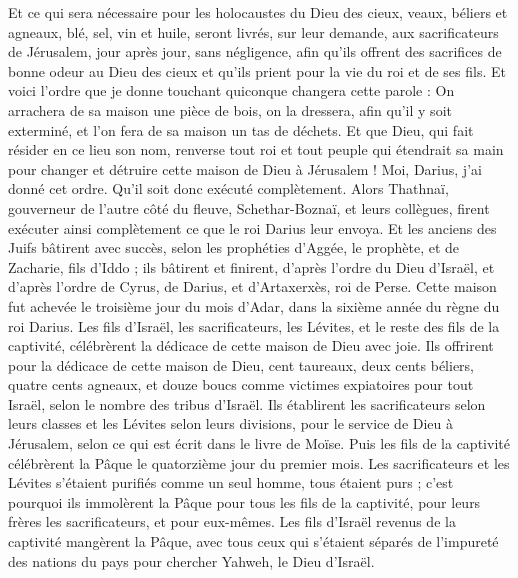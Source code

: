 \begin{multicols}{2}
Et ce qui sera nécessaire pour les holocaustes du Dieu des cieux, veaux, béliers et agneaux, blé, sel, vin et huile, seront livrés, sur leur demande, aux sacrificateurs de Jérusalem, jour après jour, sans négligence,
afin qu'ils offrent des sacrifices de bonne odeur au Dieu des cieux et qu'ils prient pour la vie du roi et de ses fils.
Et voici l’ordre que je donne touchant quiconque changera cette parole : On arrachera de sa maison une pièce de bois, on la dressera, afin qu'il y soit exterminé, et l’on fera de sa maison un tas de déchets.
Et que Dieu, qui fait résider en ce lieu son nom, renverse tout roi et tout peuple qui étendrait sa main pour changer et détruire cette maison de Dieu à Jérusalem ! Moi, Darius, j’ai donné cet ordre. Qu'il soit donc exécuté complètement.
Alors Thathnaï, gouverneur de l'autre côté du fleuve,  Schethar-Boznaï, et leurs collègues, firent exécuter ainsi complètement ce que le roi Darius leur envoya.
Et les anciens des Juifs bâtirent avec succès, selon les prophéties d'Aggée, le prophète, et de Zacharie, fils d’Iddo ; ils bâtirent et finirent, d'après l'ordre du Dieu d'Israël, et d'après l'ordre de Cyrus, de Darius, et d'Artaxerxès, roi de Perse.
Cette maison fut achevée le troisième jour du mois d'Adar, dans la sixième année du règne du roi Darius.
Les fils d'Israël, les sacrificateurs, les Lévites, et le reste des fils de la captivité, célébrèrent la dédicace de cette maison de Dieu avec joie.
Ils offrirent pour la dédicace de cette maison de Dieu, cent taureaux, deux cents béliers, quatre cents agneaux, et douze boucs comme victimes expiatoires pour tout Israël, selon le nombre des tribus d'Israël.
Ils établirent les sacrificateurs selon leurs classes et les Lévites selon leurs divisions, pour le service de Dieu à Jérusalem,  selon ce qui est écrit dans le livre de Moïse.
Puis les fils de la captivité célébrèrent la Pâque le quatorzième jour du premier mois.
Les sacrificateurs et les Lévites s'étaient purifiés comme un seul homme, tous étaient purs ; c'est pourquoi ils immolèrent la Pâque pour tous les fils de la captivité, pour leurs frères les sacrificateurs, et pour eux-mêmes.
Les fils d'Israël revenus de la captivité mangèrent la Pâque, avec tous ceux qui s'étaient séparés de l’impureté des nations du pays pour chercher Yahweh, le Dieu d'Israël.

\end{multicols}
